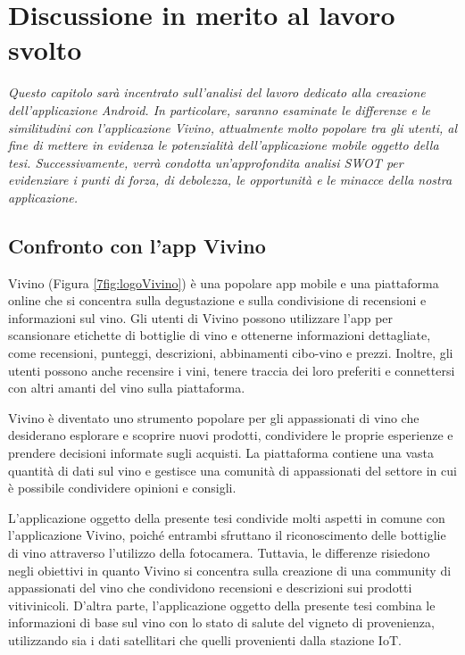 \chapter{Discussione in merito al lavoro svolto}

\begin{preamble}
{\em
Questo capitolo sarà incentrato sull'analisi del lavoro dedicato alla creazione dell'applicazione Android. In particolare, saranno esaminate le differenze e le similitudini con l'applicazione Vivino, attualmente molto popolare tra gli utenti, al fine di mettere in evidenza le potenzialità dell'applicazione mobile oggetto della tesi. \newline \indent Successivamente, verrà condotta un'approfondita analisi SWOT per evidenziare i punti di forza, di debolezza, le opportunità e le minacce della nostra applicazione.
}
\end{preamble}

\section{Confronto con l'app Vivino}

Vivino (Figura \ref{7fig:logoVivino}) è una popolare app mobile e una piattaforma online che si concentra sulla degustazione e sulla condivisione di recensioni e informazioni sul vino. Gli utenti di Vivino possono utilizzare l'app per scansionare etichette di bottiglie di vino e ottenerne informazioni dettagliate, come recensioni, punteggi, descrizioni, abbinamenti cibo-vino e prezzi. Inoltre, gli utenti possono anche recensire i vini, tenere traccia dei loro preferiti e connettersi con altri amanti del vino sulla piattaforma.

Vivino è diventato uno strumento popolare per gli appassionati di vino che desiderano esplorare e scoprire nuovi prodotti, condividere le proprie esperienze e prendere decisioni informate sugli acquisti. La piattaforma contiene una vasta quantità di dati sul vino e gestisce una comunità di appassionati del settore in cui è possibile condividere opinioni e consigli.

L'applicazione oggetto della presente tesi condivide molti aspetti in comune con l'applicazione Vivino, poiché entrambi sfruttano il riconoscimento delle bottiglie di vino attraverso l'utilizzo della fotocamera. Tuttavia, le differenze risiedono negli obiettivi in quanto Vivino si concentra sulla creazione di una community di appassionati del vino che condividono recensioni e descrizioni sui prodotti vitivinicoli. D'altra parte, l'applicazione oggetto della presente tesi combina le informazioni di base sul vino con lo stato di salute del vigneto di provenienza, utilizzando sia i dati satellitari che quelli provenienti dalla stazione IoT.

